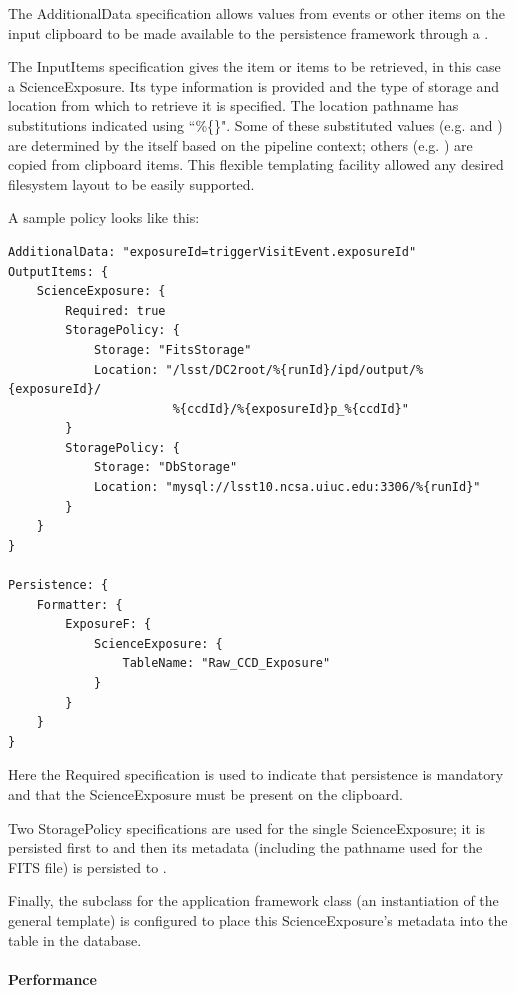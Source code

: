 The AdditionalData specification allows values from events or
other items on the input clipboard to be made available to the
persistence framework through a .

The InputItems specification gives the item or items to be
retrieved, in this case a ScienceExposure.  Its type information is
provided and the type of storage and location from which to retrieve it
is specified.  The location pathname has substitutions indicated using
``\%\{\}".  Some of these substituted values (e.g. 
and ) are determined by the  itself based on the
pipeline context; others (e.g. ) are copied from
clipboard items.  This flexible templating facility allowed any desired
filesystem layout to be easily supported.

A sample  policy looks like this:
\begin{verbatim}
AdditionalData: "exposureId=triggerVisitEvent.exposureId"
OutputItems: {
    ScienceExposure: {
        Required: true
        StoragePolicy: {
            Storage: "FitsStorage"
            Location: "/lsst/DC2root/%{runId}/ipd/output/%{exposureId}/
                       %{ccdId}/%{exposureId}p_%{ccdId}"
        }
        StoragePolicy: {
            Storage: "DbStorage"
            Location: "mysql://lsst10.ncsa.uiuc.edu:3306/%{runId}"
        }
    }
}

Persistence: {
    Formatter: {
        ExposureF: {
            ScienceExposure: {
                TableName: "Raw_CCD_Exposure"
            }
        }
    }
}
\end{verbatim}

Here the Required specification is used to indicate that
persistence is mandatory and that the ScienceExposure must be present on
the clipboard.

Two StoragePolicy specifications are used for the single
ScienceExposure; it is persisted first to  and then its
metadata (including the pathname used for the FITS file) is persisted to
.

Finally, the  subclass for the 
application framework class (an instantiation of the general
 template) is configured to place this ScienceExposure's
metadata into the  table in the database.

\paragraph{Performance}

